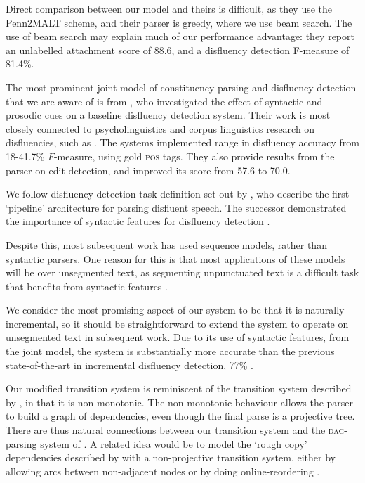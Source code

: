 \documentclass[11pt,letterpaper]{article}
\begin{document}
Direct comparison between our model and theirs is difficult,
as they use the Penn2MALT scheme, and their parser is greedy, where we use
beam search. The use of beam search may explain much of our performance advantage:
they report an unlabelled attachment score of 88.6, and a disfluency detection
F-measure of 81.4\%.

The most prominent joint model of constituency parsing and disfluency detection
that we are aware of is from \citet{hale:06}, who investigated the effect of
syntactic and prosodic cues on a baseline disfluency detection system.  Their
work is most closely connected to psycholinguistics and corpus linguistics research
on disfluencies, such as \citet{shriberg:98}. The systems \citeauthor{hale:06}
implemented range in disfluency accuracy from
18-41.7\% $F$-measure, using gold \textsc{pos} tags. They also provide results
from the  \citet{Charniak01a} parser on edit detection, and improved its score
from 57.6 to 70.0.

We follow disfluency detection task definition set out by 
\citet{Charniak01b}, who describe the first `pipeline' architecture for parsing
disfluent speech.  The successor
demonstrated the importance of syntactic features for disfluency detection
\citep{Johnson04a}.

Despite this, most subsequent work has used sequence models, rather than syntactic
parsers.  One reason for this is that most applications of these models will be
over unsegmented text, as segmenting unpunctuated text
is a difficult task that benefits from syntactic features \citep{zhang:13}.

We consider the most promising aspect of our system to be that it is naturally
incremental, so it should be straightforward to extend the system to operate
on unsegmented text in subsequent work.  Due to its use of syntactic features,
from the joint model, the system is substantially more accurate than the previous
state-of-the-art in incremental disfluency detection, 77\% \citep{zwarts:10}.

Our modified transition system is reminiscent
of the transition system described by \citet{honnibal:13}, in that it is
non-monotonic.  The non-monotonic behaviour allows the parser to build a graph of dependencies,
even though the final parse is a projective tree. There are thus natural connections
between our transition system and the \textsc{dag}-parsing system of \citet{sagae:08}.
A related idea would be to model the `rough copy' dependencies described by 
\citet{Johnson04a} with a non-projective transition system, either by allowing
arcs between non-adjacent nodes \citep{cohen:11} or by doing online-reordering
\citep{nivre:09}.
\end{document}
